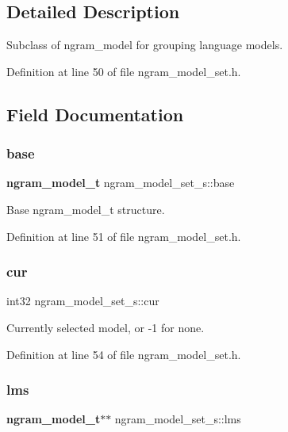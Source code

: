 \subsection{Detailed Description}
Subclass of ngram\+\_\+model for grouping language models. 

Definition at line 50 of file ngram\+\_\+model\+\_\+set.\+h.



\subsection{Field Documentation}
\mbox{\label{structngram__model__set__s_a3b88f17aa148ceac4f32dd4cbf5f4f81}} 
\subsubsection{base}
{\footnotesize\ttfamily \textbf{ ngram\+\_\+model\+\_\+t} ngram\+\_\+model\+\_\+set\+\_\+s\+::base}



Base ngram\+\_\+model\+\_\+t structure. 



Definition at line 51 of file ngram\+\_\+model\+\_\+set.\+h.

\mbox{\label{structngram__model__set__s_a031e7d7dcf1667f69e1cb980f45623cb}} 
\subsubsection{cur}
{\footnotesize\ttfamily int32 ngram\+\_\+model\+\_\+set\+\_\+s\+::cur}



Currently selected model, or -\/1 for none. 



Definition at line 54 of file ngram\+\_\+model\+\_\+set.\+h.

\mbox{\label{structngram__model__set__s_a862d4c4feb5a903101f4a0fdc5ba8a62}} 
\subsubsection{lms}
{\footnotesize\ttfamily \textbf{ ngram\+\_\+model\+\_\+t}$\ast$$\ast$ ngram\+\_\+model\+\_\+set\+\_\+s\+::lms}



